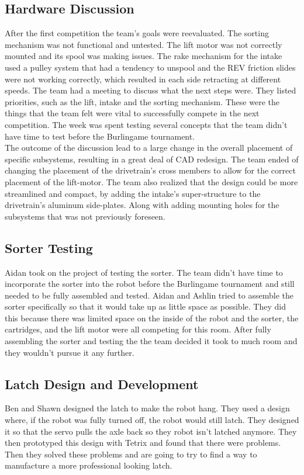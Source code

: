 \documentclass{article}
\begin{document}
\subsection{Hardware Discussion}
After the first competition the team's goals were reevaluated. The sorting mechanism was not functional and untested. The lift motor was not correctly mounted and its spool was making issues. The rake mechanism for the intake used a pulley system that had a tendency to unspool and the REV friction slides were not working correctly, which resulted in each side retracting at different speeds. The team had a meeting to discuss what the next steps were. They listed priorities, such as the lift, intake and the sorting mechanism. These were the things that the team felt were vital to successfully compete in the next competition. The week was spent testing several concepts that the team didn't have time to test before the Burlingame tournament. \\

The outcome of the discussion lead to a large change in the overall placement of specific subsystems, resulting in a great deal of CAD redesign. The team ended of changing the placement of the drivetrain's cross members to allow for the correct placement of the lift-motor. The team also realized that the design could be more streamlined and compact, by adding the intake's super-structure to the drivetrain's aluminum side-plates. Along with adding mounting holes for the subsystems that was not previously foreseen.  


\subsection{Sorter Testing}
Aidan took on the project of testing the sorter. The team didn't have time to incorporate the sorter into the robot before the Burlingame tournament and still needed to be fully assembled and tested. Aidan and Ashlin tried to assemble the sorter specifically so that it would take up as little space as possible. They did this because there was limited space on the inside of the robot and the sorter, the cartridges, and the lift motor were all competing for this room. After fully assembling the sorter and testing the the team decided it took to much room and they wouldn't pursue it any further.

\subsection{Latch Design and Development}
Ben and Shawn designed the latch to make the robot hang. They used a design where, if the robot was fully turned off, the robot would still latch. They designed it so that the servo pulls the axle back so they robot isn't latched anymore. They then prototyped this design with Tetrix and found that there were problems. Then they solved these problems and are going to try to find a way to manufacture a more professional looking latch.
\end{document}
